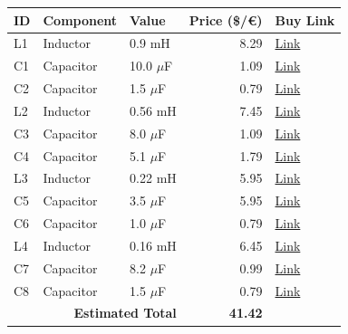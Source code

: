 \documentclass[11pt,a4paper]{report}
\begin{document}
\vspace{0.5cm}
\begin{table}[H]
    \centering
    \renewcommand{\arraystretch}{1.5}
    \begin{tabular}{@{}lllrl@{}}
        \toprule
        \textbf{ID} & \textbf{Component} & \textbf{Value} & \textbf{Price (\$/€)} & \textbf{Buy Link} \\
        \midrule
        L1 & Inductor & 0.9 mH & 8.29 & \href{https://www.parts-express.com/Dayton-Audio-LW18-90-0.90mH-18-AWG-Perfect-Layer-Inductor-257-824}{Link} \\
        C1 & Capacitor & 10.0 $\mu$F & 1.09 & \href{https://www.parts-express.com/10uF-100V-Non-Polarized-Capacitor-027-340}{Link} \\
        C2 & Capacitor & 1.5 $\mu$F & 0.79 & \href{https://www.parts-express.com/Solen-1.5uF-400V-Polypropylene-Capacitor-027-528}{Link} \\
        L2 & Inductor & 0.56 mH & 7.45 & \href{https://www.soundimports.eu/en/jantzen-audio-000-2377.html}{Link} \\
        C3 & Capacitor & 8.0 $\mu$F & 1.09 & \href{https://www.parts-express.com/8.0uF-100V-Non-Polarized-Capacitor-027-338}{Link} \\
        C4 & Capacitor & 5.1 $\mu$F & 1.79 & \href{https://www.parts-express.com/Solen-5.1uF-400V-Polypropylene-Capacitor-027-554}{Link} \\
        L3 & Inductor & 0.22 mH & 5.95 & \href{https://www.soundimports.eu/en/dayton-audio-lw18-22.html}{Link} \\
        C5 & Capacitor & 3.5 $\mu$F & 5.95 & \href{https://www.soundimports.eu/en/audyn-q6-3-5-600.html}{Link} \\
        C6 & Capacitor & 1.0 $\mu$F & 0.79 & \href{https://www.parts-express.com/Dayton-Audio-PMPC-1.0-1.0uF-250V-Precision-Audio-Capacitor-027-210}{Link} \\
        L4 & Inductor & 0.16 mH & 6.45 & \href{https://www.soundimports.eu/en/jantzen-audio-000-1627.html}{Link} \\
        C7 & Capacitor & 8.2 $\mu$F & 0.99 & \href{https://www.soundimports.eu/en/it-intertechnik-elcr-8-2-100.html}{Link} \\
        C8 & Capacitor & 1.5 $\mu$F & 0.79 & \href{https://www.parts-express.com/Solen-1.5uF-400V-Polypropylene-Capacitor-027-528}{Link} \\
        \midrule
        \multicolumn{3}{r}{\textbf{Estimated Total}} & \textbf{41.42} & \\
        \bottomrule
    \end{tabular}
\end{table}
\end{document}
